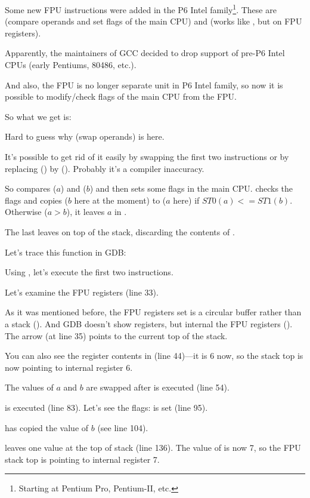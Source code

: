 \label{gcc481_o3}

Some new FPU instructions were added in the P6 Intel family\footnote{Starting at Pentium Pro, Pentium-II, etc.}.
These are  (compare operands and set flags of the main CPU) and 
 (works like , but on FPU registers).

Apparently, the maintainers of GCC decided to drop support of pre-P6 Intel CPUs (early Pentiums, 80486, etc.).

And also, the FPU is no longer separate unit in P6 Intel family, so now it is possible to modify/check flags of the main CPU from the FPU.

So what we get is:



Hard to guess why  (swap operands) is here.

It's possible to get rid of it easily by swapping the first two \FLD instructions or by replacing 
 () by  ().
Probably it's a compiler inaccuracy.

So  compares  ($a$) and  ($b$) 
and then sets some flags in the main CPU.
 checks the flags and copies  
($b$ here at the moment) to 
 ($a$ here) if $ST0 (a) <= ST1 (b)$.
Otherwise ($a>b$), it leaves $a$ in .

The last \FSTP leaves  on top of the stack, discarding the contents of .

Let's trace this function in GDB:



Using , 
let's execute the first two \FLD instructions.

Let's examine the FPU registers (line 33).

As it was mentioned before, the FPU registers set is a circular buffer rather than a stack ().
And GDB doesn't show  registers, but internal the FPU registers (). 
The arrow (at line 35) points to the current top of the stack.

You can also see the  register contents in  (line 44)---it is 6 now, 
so the stack top is now pointing to internal register 6.

The values of $a$ and $b$ are swapped after  is executed (line 54).

 is executed (line 83). 
Let's see the flags: \CF is set (line 95).

 has copied the value of $b$ (see line 104).

\FSTP leaves one value at the top of stack (line 136). 
The value of  is now 7, so the FPU stack top is pointing to internal register 7.

